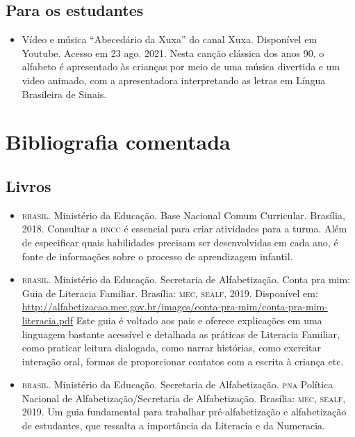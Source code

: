 \documentclass[11pt]{extarticle}
\begin{document}
\subsection{Para os estudantes}
\begin{itemize}
\item Vídeo e música ``Abecedário da Xuxa'' do canal Xuxa. Disponível em Youtube. Acesso em 23 ago. 2021. 
Nesta canção clássica dos anos 90, o alfabeto é apresentado às crianças por meio de uma música 
divertida e um video animado, com a apresentadora interpretando as letras em Língua Brasileira de Sinais.
\end{itemize}


\section{Bibliografia comentada}

\subsection{Livros}

\begin{itemize}
\item \textsc{brasil}. Ministério da Educação. Base Nacional Comum Curricular. Brasília, 2018.
Consultar a \textsc{bncc} é essencial para criar atividades para a turma. Além de especificar 
quais habilidades precisam ser desenvolvidas em cada ano, é fonte de informações sobre 
o processo de aprendizagem infantil. 

\item \textsc{brasil}. Ministério da Educação. Secretaria de Alfabetização. Conta pra mim: Guia de Literacia Familiar. 
Brasília: \textsc{mec, sealf}, 2019. Disponível em: \url{http://alfabetizacao.mec.gov.br/images/conta-pra-mim/conta-pra-mim-literacia.pdf}
Este guia é voltado aos pais e oferece explicações em uma linguagem bastante acessível e detalhada as práticas de Literacia Familiar, 
como praticar leitura dialogada, como narrar histórias, como exercitar interação oral, formas de proporcionar contatos com a escrita à criança etc. 
 
\item \textsc{brasil}. Ministério da Educação. Secretaria de Alfabetização. \textsc{pna} Política Nacional de Alfabetização/Secretaria 
de Alfabetização. Brasília: \textsc{mec, sealf}, 2019.
Um guia fundamental para trabalhar pré-alfabetização e alfabetização de estudantes, que ressalta a importância da Literacia e da Numeracia. 


\end{itemize}
\end{document}
